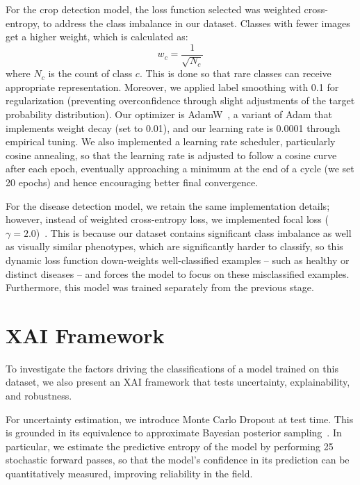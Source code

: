 \documentclass{bmvc2k}
\begin{document}
For the crop detection model, the loss function selected was weighted cross-entropy, to address the class imbalance in our dataset. Classes with fewer images get a higher weight, which is calculated as:
\begin{equation}
    w_c = \frac{1}{\sqrt{N_c}}
\end{equation}
where $N_c$ is the count of class $c$. This is done so that rare classes can receive appropriate representation. Moreover, we applied label smoothing with 0.1 for regularization (preventing overconfidence through slight adjustments of the target probability distribution). Our optimizer is AdamW~\cite{loshchilov2017decoupled}, a variant of Adam that implements weight decay (set to 0.01), and our learning rate is 0.0001 through empirical tuning. We also implemented a learning rate scheduler, particularly cosine annealing, so that the learning rate is adjusted to follow a cosine curve after each epoch, eventually approaching a minimum at the end of a cycle (we set 20 epochs) and hence encouraging better final convergence.

For the disease detection model, we retain the same implementation details; however, instead of weighted cross-entropy loss, we implemented focal loss ($\gamma=2.0$)~\cite{lin2017focal}. This is because our dataset contains significant class imbalance as well as visually similar phenotypes, which are significantly harder to classify, so this dynamic loss function down-weights well-classified examples -- such as healthy or distinct diseases -- and forces the model to focus on these misclassified examples. Furthermore, this model was trained separately from the previous stage.

\section{XAI Framework}

To investigate the factors driving the classifications of a model trained on this dataset, we also present an XAI framework that tests uncertainty, explainability, and robustness.

For uncertainty estimation, we introduce Monte Carlo Dropout at test time. This is grounded in its equivalence to approximate Bayesian posterior sampling~\cite{gal2016dropout}. In particular, we estimate the predictive entropy of the model by performing 25 stochastic forward passes, so that the model's confidence in its prediction can be quantitatively measured, improving reliability in the field.
\end{document}
